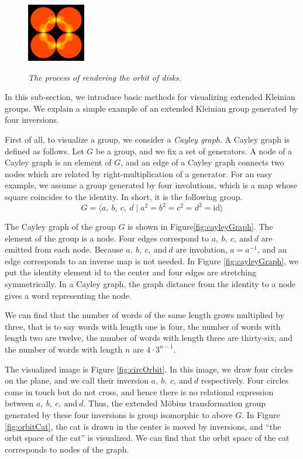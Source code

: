 \begin{figure}[htbp]
\begin{minipage}[t]{0.16\hsize}
  \subcaption{}
  \label{fig:level2}
 \end{minipage}
 \begin{minipage}[t]{0.16\hsize}
  \center
  \includegraphics[width=1in, height=1in, keepaspectratio]{img/preparation/orbit/levelMaxc.pdf}
  \subcaption{}
  \label{fig:levelMax}
 \end{minipage}
 \caption{\textit{The process of rendering the orbit of disks.}}
 \label{fig:schottkyProcess}
\end{figure}

\noindent In this sub-section, we introduce basic methods for
visualizing extended Kleinian groups.
We explain a simple example of an extended Kleinian group generated by
four inversions.

First of all, to visualize a group, we consider a \textit{Cayley graph}.
A Cayley graph is defined as follows. Let $G$ be a group, and we fix a
set of generators.
A node of a Cayley graph is an element of $G$, and an edge of a Cayley
graph connects two nodes which are related by right-multiplication of a
generator.
For an easy example, we assume a group generated by four
involutions, which is a map whose square coincides to the identity.
In short, it is the following group.
\[ G=\langle a,~b,~c,~d \mid a^2=b^2=c^2=d^2 = \mathrm{id} \rangle \]

The Cayley graph of the group $G$ is shown in Figure\ref{fig:cayleyGraph}. 
The element of the group is a node. Four edges correspond to 
$a,~b,~c,~\text{and}~d$ are emitted from each node.
Because $a,~b,~c,~\text{and}~d$ are involution, $a=a^{-1}$, and
an edge corresponds to an inverse map is not needed.
In Figure \ref{fig:cayleyGraph}, we put the identity element $\mathrm{id}$
to the center and four edges are stretching symmetrically.
In a Cayley graph, the graph distance from the identity to a node gives 
a word representing the node.

We can find that the number of words of the same length grows multiplied by three, 
that is to say words with length one is four, the number of words with length two are
twelve, the number of words with length three are thirty-six, and the
number of words with length $n$ are $4 \cdot 3^{n-1}$.

The visualized image is Figure \ref{fig:circOrbit}. In this image,
we draw four circles on the plane, and we call their inversion
$a,~b,~c,~\text{and}~d$ respectively. Four circles come in touch but do not cross,
and hence there is no relational expression between $a,~b,~c,~\text{and}~d$.
Thus, the extended M\"obius transformation group generated by these four inversions
is group isomorphic to above $G$.
In Figure \ref{fig:orbitCat}, the cat is drawn in the center is moved by
inversions, and ``the orbit space of the cat'' is visualized.
We can find that the orbit space of the cat corresponds to nodes of
the graph.

